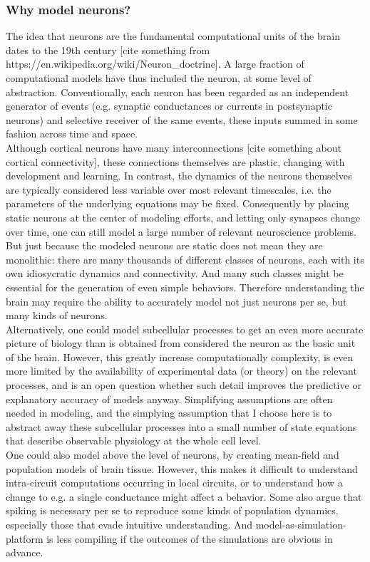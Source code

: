 \subsubsection{Why model neurons?}
The idea that neurons are the fundamental computational units of the brain dates to the 19th century [cite something from https://en.wikipedia.org/wiki/Neuron_doctrine].  A large fraction of computational models have thus included the neuron, at some level of abstraction.  Conventionally, each neuron has been regarded as an independent generator of events (e.g. synaptic conductances or currents in postsynaptic neurons) and selective receiver of the same events, these inputs summed in some fashion across time and space. 
\\
Although cortical neurons have many interconnections [cite something about cortical connectivity], these connections themselves are plastic, changing with development and learning.  In contrast, the dynamics of the neurons themselves are typically considered less variable over most relevant timescales, i.e. the parameters of the underlying equations may be fixed.  Consequently by placing static neurons at the center of modeling efforts, and letting only synapses change over time, one can still model a large number of relevant neuroscience problems.  But just because the modeled neurons are static does not mean they are monolithic: there are many thousands of different classes of neurons, each with its own idiosycratic dynamics and connectivity. And many such classes might be essential for the generation of even simple behaviors.  Therefore understanding the brain may require the ability to accurately model not just neurons per se, but many kinds of neurons.
\\
Alternatively, one could model subcellular processes to get an even more accurate picture of biology than is obtained from considered the neuron as the basic unit of the brain.  However, this greatly increase computationally complexity, is even more limited by the availability of experimental data (or theory) on the relevant processes, and is an open question whether such detail improves the predictive or explanatory accuracy of models anyway.  Simplifying assumptions are often needed in modeling, and the simplying assumption that I choose here is to abstract away these subcellular processes into a small number of state equations that describe observable physiology at the whole cell level.
\\
One could also model above the level of neurons, by creating mean-field and population models of brain tissue.  However, this makes it difficult to understand intra-circuit computations occurring in local circuits, or to understand how a change to e.g. a single conductance might affect a behavior.  Some also argue that spiking is necessary per se to reproduce some kinds of population dynamics, especially those that evade intuitive understanding.  And model-as-simulation-platform is less compiling if the outcomes of the simulations are obvious in advance.
\\
